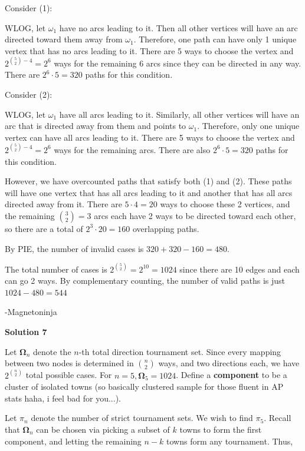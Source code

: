 \begin{enumerate}
 Consider (1):

 WLOG, let $\omega_1$ have no arcs leading to it. Then all other vertices will have an arc directed toward them away from $\omega_1$. Therefore, one path can have only 1 unique vertex that has no arcs leading to it. There are 5 ways to choose the vertex and $2^{\binom{5}{2}-4}=2^6$ ways for the remaining 6 arcs since they can be directed in any way. There are $2^6\cdot5=320$ paths for this condition.

 Consider (2):

 WLOG, let $\omega_1$ have all arcs leading to it. Similarly, all other vertices will have an arc that is directed away from them and points to $\omega_1$. Therefore, only one unique vertex can have all arcs leading to it. There are 5 ways to choose the vertex and $2^{\binom{5}{2}-4}=2^6$ ways for the remaining arcs. There are also $2^6\cdot5=320$ paths for this condition.

 However, we have overcounted paths that satisfy both (1) and (2). These paths will have one vertex that has all arcs leading to it and another that has all arcs directed away from it. There are $5\cdot4=20$ ways to choose these 2 vertices, and the remaining $\binom{3}{2}=3$ arcs each have 2 ways to be directed toward each other, so there are a total of $2^3\cdot 20=160$ overlapping paths.

 By PIE, the number of invalid cases is $320+320-160=480$.

 The total number of cases is $2^{\binom{5}{2}}=2^{10}=1024$ since there are 10 edges and each can go 2 ways. By complementary counting, the number of valid paths is just $1024-480=\boxed{544}$

 -Magnetoninja

 



\textbf{Solution 7}

Let $\mathbf{\Omega}_n$ denote the $n$-th total direction tournament set. Since every mapping between two nodes is determined in $\binom{n}{2}$ ways, and two directions each, we have $2^{\binom{n}{2}}$ total possible cases. For $n=5, \mathbf{\Omega}_5 = 1024$. Define a \textbf{component} to be a cluster of isolated towns (so basically clustered sample for those fluent in AP stats haha, i feel bad for you...).

 Let $\pi_n$ denote the number of strict tournament sets. We wish to find $\pi_5$. Recall that $\mathbf{\Omega}_n$ can be chosen via picking a subset of $k$ towns to form the first component, and letting the remaining $n-k$ towns form any tournament. Thus,


\end{enumerate}
